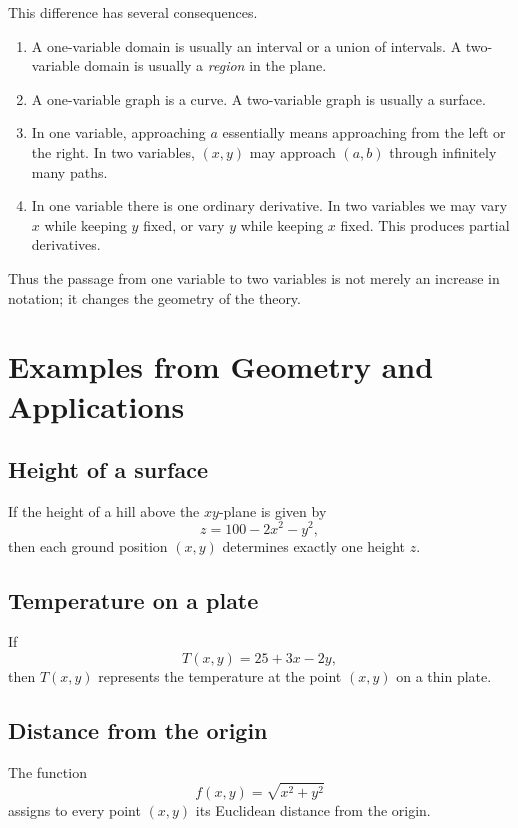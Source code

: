 \documentclass[11pt,oneside]{book}
\theoremstyle{studentthm}
\theoremstyle{definition}
\begin{document}
This difference has several consequences.

\begin{enumerate}
\item A one-variable domain is usually an interval or a union of
intervals. A two-variable domain is usually a \emph{region} in the
plane.

\item A one-variable graph is a curve. A two-variable graph is usually
a surface.

\item In one variable, approaching \(a\) essentially means approaching
from the left or the right. In two variables, \((x,y)\) may approach
\((a,b)\) through infinitely many paths.

\item In one variable there is one ordinary derivative. In two
variables we may vary \(x\) while keeping \(y\) fixed, or vary \(y\)
while keeping \(x\) fixed. This produces partial derivatives.
\end{enumerate}

Thus the passage from one variable to two variables is not merely an
increase in notation; it changes the geometry of the theory.

\section{Examples from Geometry and Applications}

\subsection*{Height of a surface}

If the height of a hill above the \(xy\)-plane is given by
\[
z=100-2x^2-y^2,
\]
then each ground position \((x,y)\) determines exactly one height
\(z\).

\subsection*{Temperature on a plate}

If
\[
T(x,y)=25+3x-2y,
\]
then \(T(x,y)\) represents the temperature at the point \((x,y)\) on a
thin plate.

\subsection*{Distance from the origin}

The function
\[
f(x,y)=\sqrt{x^2+y^2}
\]
assigns to every point \((x,y)\) its Euclidean distance from the
origin.
\end{document}
